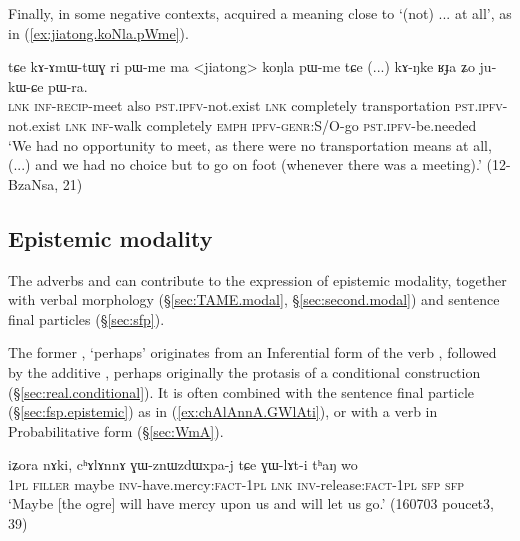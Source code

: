 Finally, in some negative contexts,  acquired a meaning close to  `(not) ... at all', as in (\ref{ex:jiatong.koNla.pWme}).

\begin{exe}
\ex \label{ex:jiatong.koNla.pWme}
\gll  tɕe kɤ-ɤmɯ-tɯɣ ri pɯ-me ma <jiatong> koŋla pɯ-me tɕe (...) kɤ-ŋke ʁɟa ʑo ju-kɯ-ɕe pɯ-ra.  \\
\textsc{lnk} \textsc{inf}-\textsc{recip}-meet also \textsc{pst}.\textsc{ipfv}-not.exist \textsc{lnk} completely transportation \textsc{pst}.\textsc{ipfv}-not.exist \textsc{lnk} { } \textsc{inf}-walk completely \textsc{emph} \textsc{ipfv}-\textsc{genr}:S/O-go \textsc{pst}.\textsc{ipfv}-be.needed \\
\glt `We had no opportunity to meet, as there were no transportation means at all, (...) and we had no choice but to go on foot (whenever there was a meeting).' (12-BzaNsa, 21)
\end{exe} 


 \subsection{Epistemic modality}\label{sec:modality.adverbs}
 The adverbs  and   can contribute to the expression of epistemic modality, together with verbal morphology (§\ref{sec:TAME.modal}, §\ref{sec:second.modal}) and sentence final particles (§\ref{sec:sfp}).
 
 The former , `perhaps' originates from an Inferential form of the verb , followed by the additive , perhaps originally the protasis of a conditional construction (§\ref{sec:real.conditional}). It is often combined with the sentence final particle  (§\ref{sec:fsp.epistemic}) as in (\ref{ex:chAlAnnA.GWlAti}), or with a  verb in Probabilitative form (§\ref{sec:WmA}).
 
 \begin{exe}
\ex \label{ex:chAlAnnA.GWlAti}
\gll iʑora nɤki, cʰɤlɤnnɤ ɣɯ-znɯzdɯxpa-j tɕe ɣɯ-lɤt-i tʰaŋ wo \\
\textsc{1pl} \textsc{filler} maybe \textsc{inv}-have.mercy:\textsc{fact}-\textsc{1pl} \textsc{lnk} \textsc{inv}-release:\textsc{fact}-\textsc{1pl} \textsc{sfp} \textsc{sfp} \\
\glt `Maybe [the ogre] will have mercy upon us and will let us go.' (160703 poucet3, 39)
 \end{exe} 
 
